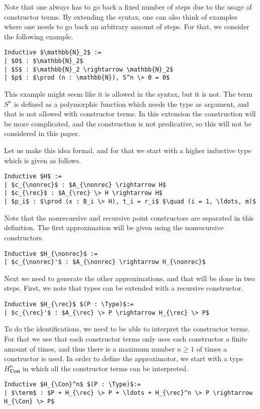 \documentclass[a4paper,UKenglish]{lipics-v2016}
\newcommand{\rec}[0]{\operatorname{rec}}
\newcommand{\nonrec}[0]{\operatorname{nonrec}}
\newcommand{\term}[0]{\textbf{term}}
\newcommand{\Con}[0]{\textbf{Con}}
\newcommand{\Type}[0]{\operatorname{\textsc{Type}}}
\begin{document}
Note that one always has to go back a fixed number of steps due to the usage of constructor terms.
By extending the syntax, one can also think of examples where one needs to go back an arbitrary amount of steps.
For that, we consider the following example.
\lstset{language=Coq}
\begin{lstlisting}
Inductive $\mathbb{N}_2$ :=
| $0$ : $\mathbb{N}_2$
| $S$ : $\mathbb{N}_2 \rightarrow \mathbb{N}_2$
| $p$ : $\prod (n : \mathbb{N}), S^n \> 0 = 0$
\end{lstlisting}
This example might seem like it is allowed in the syntax, but it is not.
The term $S^n$ is defined as a polymorphic function which needs the type as argument, and that is not allowed with constructor terms.
In this extension the construction will be more complicated, and the construction is not predicative, so this will not be considered in this paper.

Let us make this idea formal, and for that we start with a higher inductive type which is given as follows.
\lstset{language=Coq}
\begin{lstlisting}[label={lst:HIT}]
Inductive $H$ :=
| $c_{\nonrec}$ : $A_{\nonrec} \rightarrow H$
| $c_{\rec}$ : $A_{\rec} \> H \rightarrow H$
| $p_i$ : $\prod (x : B_i \> H), t_i = r_i$ $\quad (i = 1, \ldots, m)$
\end{lstlisting}
Note that the nonrecursive and recursive point constructors are separated in this definition.
The first approximation will be given using the nonrecursive constructors.
\lstset{language=Coq}
\begin{lstlisting}
Inductive $H_{\nonrec}$ :=
| $c_{\nonrec}'$ : $A_{\nonrec} \rightarrow H_{\nonrec}$
\end{lstlisting}

Next we need to generate the other approximations, and that will be done in two steps.
First, we note that types can be extended with a recursive constructor.
\lstset{language=Coq}
\begin{lstlisting}
Inductive $H_{\rec}$ $(P : \Type)$:=
| $c_{\rec}'$ : $A_{\rec} \> P \rightarrow H_{\rec} \> P$
\end{lstlisting}
To do the identifications, we need to be able to interpret the constructor terms.
For that we use that each constructor terms only uses each constructor  a finite amount of times, and thus there is a maximum number $n \geq 1$ of times a constructor is used.
In order to define the approximator, we start with a type $H_{\Con}^n$ in which all the constructor terms can be interpreted.
\lstset{language=Coq}
\begin{lstlisting}
Inductive $H_{\Con}^n$ $(P : \Type)$:=
| $\term$ : $P + H_{\rec} \> P + \ldots + H_{\rec}^n \> P \rightarrow H_{\Con} \> P$
\end{lstlisting}
\end{document}
